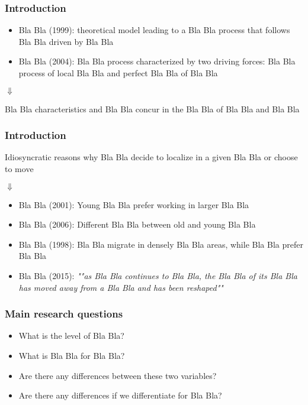 \documentclass{beamer}
\begin{document}
\begin{frame}
\frametitle{Introduction}
\begin{itemize}
\item Bla Bla (1999): theoretical model leading to a Bla Bla process that follows Bla Bla driven by Bla Bla
\item Bla Bla (2004): Bla Bla process characterized by two driving forces: Bla Bla process of local Bla Bla and perfect Bla Bla of Bla Bla
\end{itemize}
\begin{center}
$\Downarrow$
\end{center}
\begin{center}
Bla Bla characteristics and Bla Bla concur in the Bla Bla of Bla Bla and Bla Bla
\end{center}
\end{frame}

\begin{frame}
\frametitle{Introduction}
\begin{center}
Idiosyncratic reasons why Bla Bla decide to localize in a given Bla Bla or choose to move
\end{center}
\begin{center}
$\Downarrow$
\end{center}
\begin{itemize}
\item Bla Bla (2001): Young Bla Bla prefer working in larger Bla Bla
\item Bla Bla (2006): Different Bla Bla between old and young Bla Bla
\item Bla Bla (1998): Bla Bla migrate in densely Bla Bla areas, while Bla Bla prefer Bla Bla
\item Bla Bla (2015): \textsl{""as Bla Bla continues to Bla Bla, the Bla Bla of its Bla Bla has moved away from a Bla Bla and has been reshaped""}
\end{itemize}
\end{frame}

\begin{frame}
\frametitle{Main research questions}
\begin{itemize}
\item What is the level of Bla Bla? \pause
\item What is Bla Bla for Bla Bla? \pause
\item Are there any differences between these two variables? \pause
\item Are there any differences if we differentiate for Bla Bla?
\end{itemize}
\end{frame}
\end{document}
